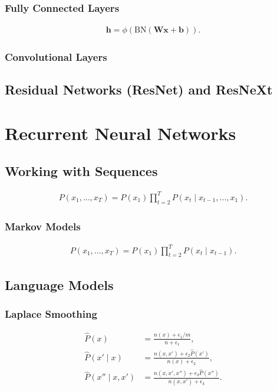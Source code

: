 \documentclass[a4paper,12pt]{article}
\theoremstyle{definition}
\begin{document}
\subsubsection*{Fully Connected Layers}

\begin{align*}
    \mathbf{h} = \phi(\mathrm{BN}(\mathbf{W}\mathbf{x} + \mathbf{b}) ).
\end{align*}


\subsubsection*{Convolutional Layers}


\subsection*{Residual Networks (ResNet) and ResNeXt}
\section{Recurrent Neural Networks}
\subsection{Working with Sequences}


\begin{align*}
    P(x_1, \ldots, x_T) = P(x_1) \prod_{t=2}^T P(x_t \mid x_{t-1}, \ldots, x_1).
\end{align*}


\subsubsection*{Markov Models}

\begin{align*}
    P(x_1, \ldots, x_T) = P(x_1) \prod_{t=2}^T P(x_t \mid x_{t-1}).
\end{align*}

\subsection{Language Models}
\subsubsection*{Laplace Smoothing}
\begin{align*}
    \hat{P}(x) & = \frac{n(x) + \epsilon_1/m}{n + \epsilon_1}, \\
    \hat{P}(x' \mid x) & = \frac{n(x, x') + \epsilon_2 \hat{P}(x')}{n(x) + \epsilon_2}, \\
    \hat{P}(x'' \mid x,x') & = \frac{n(x, x',x'') + \epsilon_3 \hat{P}(x'')}{n(x, x') + \epsilon_3}.
\end{align*}
\end{document}

